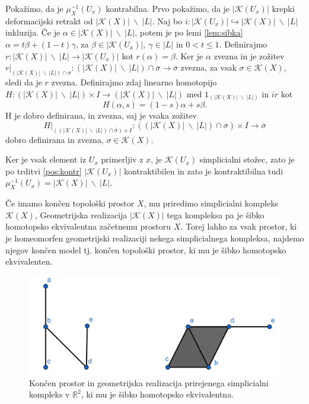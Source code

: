 \documentclass[mat1]{fmfdelo}
\newcommand{\R}{\mathbb R}
\begin{document}
\begin{dokaz}
    Pokažimo, da je $\mu_X^{-1}(U_x)$ kontrabilna. Prvo pokažimo, da je 
    $|\mathcal{K}(U_x)|$ krepki deformacijski retrakt 
    od $|\mathcal{K}(X)|\ \backslash \ |L|$. Naj bo $i:|\mathcal{K}(U_x)|\hookrightarrow |\mathcal{K}
    (X)|\ \backslash \ |L|$ inkluzija. Če je $\alpha \in |\mathcal{K}(X)|\ 
    \backslash \ |L|$, potem je po lemi \ref{lem:sibka}  $\alpha = t\beta + 
    (1-t)\gamma$, za $\beta \in |\mathcal{K}(U_x)|, \ \gamma \in |L|$ in $0<t\leq 1$. 
    Definirajmo $r:|\mathcal{K}(X)|\ \backslash \ |L|\rightarrow |\mathcal{K}(U_x)|$ 
    kot $r(\alpha)=\beta$. Ker je $\alpha$ zvezna in je zožitev $r|_{(|\mathcal{K}(X)|\ \backslash \ |L|)\cap 
    \overline{\sigma}}:(|\mathcal{K}(X)|\ \backslash \ |L|)\cap 
    \overline{\sigma} \rightarrow \overline{\sigma}$ zvezna, za vsak 
    $\sigma \in \mathcal{K}(X)$, sledi da je $r$ zvezna. Definirajmo zdaj linearno homotopijo $H:(|\mathcal{K}(X)|\ \backslash \ |L|) \times I \rightarrow (|\mathcal{K}(X)|\ \backslash \ |L|)$ med $1_{(|\mathcal{K}(X)|\ \backslash \ |L|)}$ in $ir$ kot 
    $$
    H(\alpha,s)=(1-s)\alpha + s\beta.
    $$
    H je dobro definirana, in zvezna, saj je vsaka zožitev 
    $$
    H|_{((|\mathcal{K}(X)|\ \backslash \ |L|)\cap 
    \overline{\sigma})\times I}:((|\mathcal{K}(X)|\ \backslash \ |L|)\cap 
    \overline{\sigma})\times I \rightarrow \overline{\sigma}
    $$
    dobro definirana in zvezna, $\sigma \in \mathcal{K}(X)$.

    Ker je vsak element iz $U_x$ primerljiv z $x$, je $\mathcal{K}(U_x)$ 
    simplicialni stožec, zato je po trditvi \ref{pos:kontr} $|\mathcal{K}(U_x)|$ 
    kontraktibilen in zato je kontraktibilna tudi $\mu_X^{-1}
    (U_x)=|\mathcal{K}(X)|\ \backslash \ |L|$.
\end{dokaz}


Če imamo končen topološki prostor $X$, mu priredimo simplicialni kompleks
$\mathcal{K}(X)$, Geometrijska realizacija $|\mathcal{K}(X)|$ tega kompleksa pa je šibko homotopsko ekvivalentna 
začetnemu prostoru $X$. Torej lahko za vsak prostor, ki je homeomorfen geometrijski realizaciji
nekega simplicialnega kompleksa, najdemo njegov končen model tj. končen topološki prostor, ki mu
je šibko homotopsko ekvivalenten.

\begin{figure}[h]
    \centering
    \includegraphics[width=1\linewidth]{simp.png}
    \caption{Končen prostor in geometrijska realizacija prirejenega simplicialni kompleks v $\R^2$, ki mu je šibko homotopsko ekvivalentna.}
\end{figure}
\end{document}

